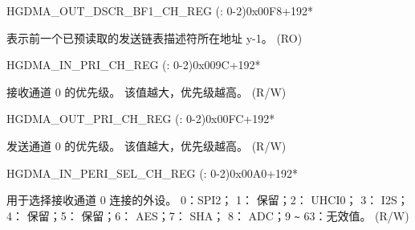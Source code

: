 \begin{register}{H}{GDMA\_OUT\_DSCR\_BF1\_CH\_REG (: 0-2)}{0x00F8+192*}\label{regdesc:GDMAOUTDSCRBF1CHNREG}
%
\regnewline%
\begin{regdesc}\begin{reglist}
\label{fielddesc:GDMAOUTLINKDSCRBF1CHN}\item [GDMA\_OUTLINK\_DSCR\_BF1\_CH\regindex{n}] 表示前一个已预读取的发送链表描述符所在地址 y-1。 (RO)
\end{reglist}\end{regdesc}
\end{register}


\begin{register}{H}{GDMA\_IN\_PRI\_CH\_REG (: 0-2)}{0x009C+192*}\label{regdesc:GDMAINPRICHNREG}
%
%
\regnewline%
\begin{regdesc}\begin{reglist}
\label{fielddesc:GDMARXPRICHN}\item [GDMA\_RX\_PRI\_CH\regindex{n}] 接收通道 0 的优先级。 该值越大，优先级越高。 (R/W)
\end{reglist}\end{regdesc}
\end{register}


\begin{register}{H}{GDMA\_OUT\_PRI\_CH\_REG (: 0-2)}{0x00FC+192*}\label{regdesc:GDMAOUTPRICHNREG}
%
%
\regnewline%
\begin{regdesc}\begin{reglist}
\label{fielddesc:GDMATXPRICHN}\item [GDMA\_TX\_PRI\_CH\regindex{n}] 发送通道 0 的优先级。 该值越大，优先级越高。 (R/W)
\end{reglist}\end{regdesc}
\end{register}


\begin{register}{H}{GDMA\_IN\_PERI\_SEL\_CH\_REG (: 0-2)}{0x00A0+192*}\label{regdesc:GDMAINPERISELCHNREG}
%
%
\regnewline%
\begin{regdesc}\begin{reglist}
\label{fielddesc:GDMAPERIINSELCHN}\item [GDMA\_PERI\_IN\_SEL\_CH\regindex{n}] 用于选择接收通道 0 连接的外设。 0：SPI2； 1： 保留；2： UHCI0； 3： I2S；   4： 保留；5： 保留；6： AES；7： SHA； 8： ADC；9 \verb+~+ 63：无效值。 (R/W)
\end{reglist}\end{regdesc}
\end{register}


